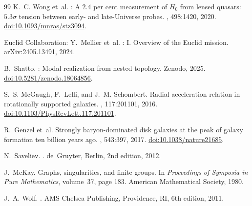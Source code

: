\documentclass[11pt,a4paper]{article}
\numberwithin{equation}{section}
\numberwithin{table}{section}
\numberwithin{figure}{section}
\begin{document}
\begin{thebibliography}{99}
K.~C. Wong et~al.
: A 2.4 per cent measurement of $H_0$ from
  lensed quasars: $5.3\sigma$ tension between early- and
  late-{Universe} probes.
, 498:1420, 2020.
  \href{https://doi.org/10.1093/mnras/stz3094}{doi:10.1093/mnras/stz3094}.

{Euclid Collaboration}: Y.~Mellier et~al.
: I. Overview of the {Euclid} mission.
\newblock arXiv:2405.13491, 2024.

B.~Shatto.
: Modal realization from nested
  topology.
\newblock Zenodo, 2025.
  \href{https://doi.org/10.5281/zenodo.18064856}{doi:10.5281/zenodo.18064856}.

S.~S. McGaugh, F.~Lelli, and J.~M. Schombert.
\newblock Radial acceleration relation in rotationally supported
  galaxies.
, 117:201101, 2016.
  \href{https://doi.org/10.1103/PhysRevLett.117.201101}{doi:10.1103/PhysRevLett.117.201101}.

R.~Genzel et~al.
\newblock Strongly baryon-dominated disk galaxies at the peak of galaxy
  formation ten billion years ago.
, 543:397, 2017.
  \href{https://doi.org/10.1038/nature21685}{doi:10.1038/nature21685}.

N.~Saveliev.
.
\newblock de~Gruyter, Berlin, 2nd edition, 2012.

J.~McKay.
\newblock Graphs, singularities, and finite groups.
\newblock In {\em Proceedings of Symposia in Pure Mathematics},
  volume~37, page 183. American Mathematical Society, 1980.

J.~A. Wolf.
.
\newblock AMS Chelsea Publishing, Providence, RI, 6th edition, 2011.

\end{thebibliography}
\end{document}
